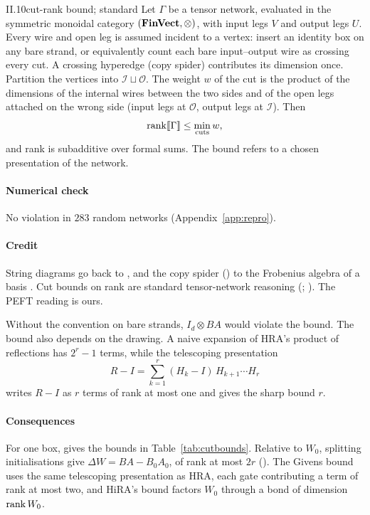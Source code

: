 \begin{theorem}{II.10}{cut-rank bound; standard}
Let $\Gamma$ be a tensor network, evaluated in the symmetric monoidal category $(\mathbf{FinVect},\otimes)$, with input legs $V$
and output legs $U$. Every wire and open leg is assumed incident to a vertex: insert an identity box on any bare strand,
or equivalently count each bare input--output wire as crossing every cut. A crossing hyperedge (copy spider) contributes
its dimension once. Partition the vertices into $\mathcal I\sqcup\mathcal O$. The weight $w$ of the cut is the product
of the dimensions of the internal wires between the two sides and of the open legs attached on the wrong side (input legs
at $\mathcal O$, output legs at $\mathcal I$). Then
\begin{equation*}
  \operatorname{rank}\llbracket\Gamma\rrbracket\le\min_{\mathrm{cuts}}w,
\end{equation*}
and rank is subadditive over formal sums. The bound refers to a chosen presentation of the network.
\end{theorem}

\paragraph{Numerical check}
No violation in $283$ random networks (Appendix~\ref{app:repro}).

\paragraph{Credit}
String diagrams go back to \citet{xjoyal1991geometry}, and the copy spider () to the Frobenius algebra of a
basis \citep{xcoecke2013new}. Cut bounds on rank are standard tensor-network reasoning (;
\citealp{kolda2009tensor,cichocki2016low}). The PEFT reading is ours.

Without the convention on bare strands, $I_d\otimes BA$ would violate the bound. The bound also depends on the drawing. A
naive expansion of HRA's product of reflections has $2^r-1$ terms, while the telescoping presentation
\begin{equation*}
  R-I=\sum_{k=1}^{r}(H_k-I)\,H_{k+1}\cdots H_r
\end{equation*}
writes $R-I$ as $r$ terms of rank at most one and gives the sharp bound $r$.

\paragraph{Consequences}
For one box,  gives the bounds in Table~\ref{tab:cutbounds}. Relative to $W_0$, splitting
initialisations give $\Delta W=BA-B_0A_0$, of rank at most $2r$ (). The Givens bound uses the same
telescoping presentation as HRA, each gate contributing a term of rank at most two, and HiRA's bound factors $W_0$
through a bond of dimension $\operatorname{rank} W_0$.

